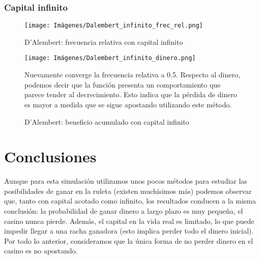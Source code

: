 \documentclass{article}
\begin{document}
\subsubsection{Capital infinito}
\begin{figure*}[!htb]
   \begin{minipage}{0.48\textwidth}
     \centering
     \texttt{[image: Imágenes/Dalembert\_infinito\_frec\_rel.png]}
     \caption*{D'Alembert: frecuencia relativa con capital infinito}\label{Fig:Data1}
   \end{minipage}\hfill
   \begin{minipage}{0.48\textwidth}
     \centering
     \texttt{[image: Imágenes/Dalembert\_infinito\_dinero.png]}
     \caption*{D'Alembert: beneficio acumulado con capital infinito}\label{Fig:Data2}
   \end{minipage}
   Nuevamente converge la frecuencia relativa a 0.5. Respecto al dinero, podemos decir que la función presenta un comportamiento que parece tender al decrecimiento. Esto indica que la pérdida de dinero es mayor a medida que se sigue apostando utilizando este método.
  
\end{figure*}

\newpage
\section{Conclusiones}
Aunque para esta simulación utilizamos unos pocos métodos para estudiar las posibilidades de ganar en la ruleta (existen muchísimos más) podemos observar que, tanto con capital acotado como infinito, los resultados conducen a la misma conclusión: la probabilidad de ganar dinero a largo plazo es muy pequeña, el casino nunca pierde. Además, el capital en la vida real es limitado, lo que puede impedir llegar a una racha ganadora (esto implica perder todo el dinero inicial). Por todo lo anterior, consideramos que la única forma de no perder dinero en el casino es no apostando.

  
\end{document}
